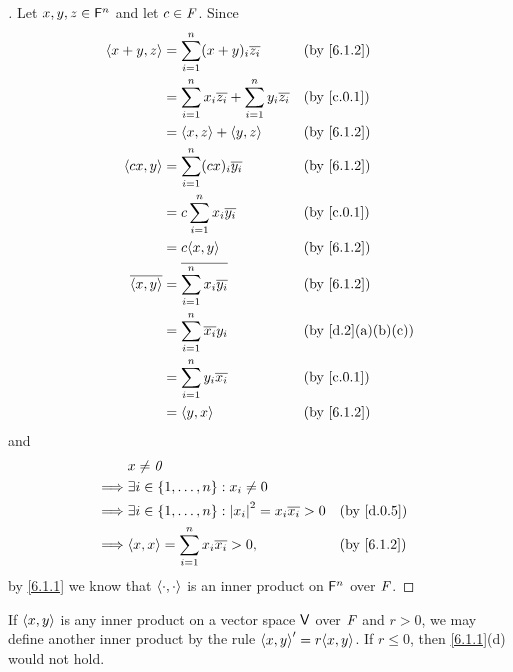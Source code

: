 \begin{proof}[]
  Let \(x, y, z \in \mathsf{F}^n\) and let \(c \in \mathit{F}\).
  Since
  \begin{align*}
    \inn{x + y, z}    & = \sum_{i = 1}^n (x + y)_i \conj{z_i}                           &  & \by{6.1.2}      \\
                      & = \sum_{i = 1}^n x_i \conj{z_i} + \sum_{i = 1}^n y_i \conj{z_i} &  & \by{c.0.1}      \\
                      & = \inn{x, z} + \inn{y, z}                                       &  & \by{6.1.2}      \\
    \inn{cx, y}       & = \sum_{i = 1}^n (cx)_i \conj{y_i}                              &  & \by{6.1.2}      \\
                      & = c \sum_{i = 1}^n x_i \conj{y_i}                               &  & \by{c.0.1}      \\
                      & = c \inn{x, y}                                                  &  & \by{6.1.2}      \\
    \conj{\inn{x, y}} & = \conj{\sum_{i = 1}^n x_i \conj{y_i}}                          &  & \by{6.1.2}      \\
                      & = \sum_{i = 1}^n \conj{x_i} y_i                                 &  & \by{d.2}[a,b,c] \\
                      & = \sum_{i = 1}^n y_i \conj{x_i}                                 &  & \by{c.0.1}      \\
                      & = \inn{y, x}                                                    &  & \by{6.1.2}
  \end{align*}
  and
  \begin{align*}
             & x \neq \zv                                                                         \\
    \implies & \exists i \in \set{1, \dots, n} : x_i \neq 0                                       \\
    \implies & \exists i \in \set{1, \dots, n} : \abs{x_i}^2 = x_i \conj{x_i} > 0 &  & \by{d.0.5} \\
    \implies & \inn{x, x} = \sum_{i = 1}^n x_i \conj{x_i} > 0,                    &  & \by{6.1.2}
  \end{align*}
  by \cref{6.1.1} we know that \(\left\langle\cdot, \cdot\right\rangle\) is an inner product on \(\mathsf{F}^n\) over \(\mathit{F}\).
\end{proof}

\begin{eg}\label{6.1.3}
  If \(\left\langle x, y\right\rangle\) is any inner product on a vector space \(\mathsf{V}\) over \(\mathit{F}\) and \(r > 0\), we may define another inner product by the rule \(\inn{x, y}' = r \inn{x, y}\).
  If \(r \leq 0\), then \cref{6.1.1}(d) would not hold.
\end{eg}

